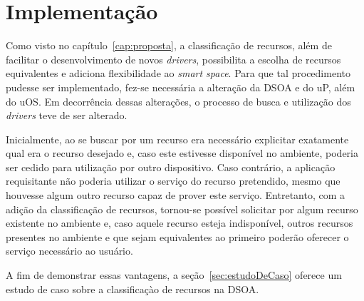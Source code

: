 \chapter{Implementação}

Como visto no capítulo~\ref{cap:proposta}, a classificação de recursos, além de facilitar o desenvolvimento de novos \emph{drivers}, possibilita a escolha de recursos equivalentes e adiciona flexibilidade ao \emph{smart space}. Para que tal procedimento pudesse ser implementado, fez-se necessária a alteração da DSOA e do uP, além do uOS. Em decorrência dessas alterações, o processo de busca e utilização dos \emph{drivers} teve de ser alterado.

Inicialmente, ao se buscar por um recurso era necessário explicitar exatamente qual era o recurso desejado e, caso este estivesse disponível no ambiente, poderia ser cedido para utilização por outro dispositivo. Caso contrário, a aplicação requisitante não poderia utilizar o serviço do recurso pretendido, mesmo que houvesse algum outro recurso capaz de prover este serviço. Entretanto, com a adição da classificação de recursos, tornou-se possível solicitar por algum recurso existente no ambiente e, caso aquele recurso esteja indisponível, outros recursos presentes no ambiente e que sejam equivalentes ao primeiro poderão oferecer o serviço necessário ao usuário.

A fim de demonstrar essas vantagens, a seção~\ref{sec:estudoDeCaso} oferece um estudo de caso sobre a classificaçào de recursos na DSOA.


